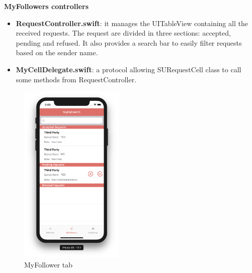 \documentclass[titlepage]{article}
\begin{document}
{		{\bf MyFollowers controllers}
		\begin{itemize}
			\item {\bf RequestController.swift}: it manages the UITableView containing all the received requests. The request are divided in three sections: accepted, pending and refused. It also provides a search bar to easily filter requests based on the sender name.
			\item {\bf MyCellDelegate.swift}: a protocol allowing SURequestCell class to call some methods from RequestController.
			
		\end{itemize}
		
		\begin{figure}[H]
			\center
			\includegraphics[width=5cm]{SimulatorScreenshots/myfollowers.png}
			\caption{MyFollower tab}
			\label{fig:Hist}
		\end{figure}
		
}
\end{document}
